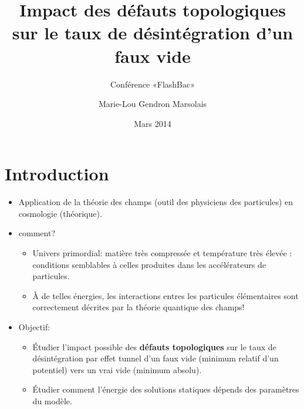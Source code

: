\documentclass{beamer}
\title{Impact des défauts topologiques sur le taux de désintégration d'un faux vide}
\subtitle{Conférence «FlashBac»}
\author{Marie-Lou Gendron Marsolais}\institute{Université de Montréal, département de physique des particules}
\date{Mars 2014}
\begin{document}
\begin{frame}
\titlepage
\end{frame}


\section{Introduction}


\begin{frame}
\begin{itemize}
\item Application de la théorie des champs (outil des physiciens des particules) en cosmologie (théorique).
\item comment? \begin{itemize}
               \item Univers primordial: matière très compressée et température très élevée : conditions semblables à celles produites dans les accélérateurs de particules.
               \item À de telles énergies, les interactions entres les particules élémentaires sont correctement décrites par la théorie quantique des champs!
               \end{itemize}
\item Objectif:\begin{itemize}
               \item Étudier l'impact possible des \textbf{défauts topologiques} sur le taux de désintégration par effet tunnel d'un faux vide (minimum relatif d'un potentiel) vers un vrai vide (minimum absolu). 
               \item Étudier comment l'énergie des solutions statiques dépends des paramètres du modèle.
               \end{itemize}
\end{itemize}
\end{frame}
\end{document}
